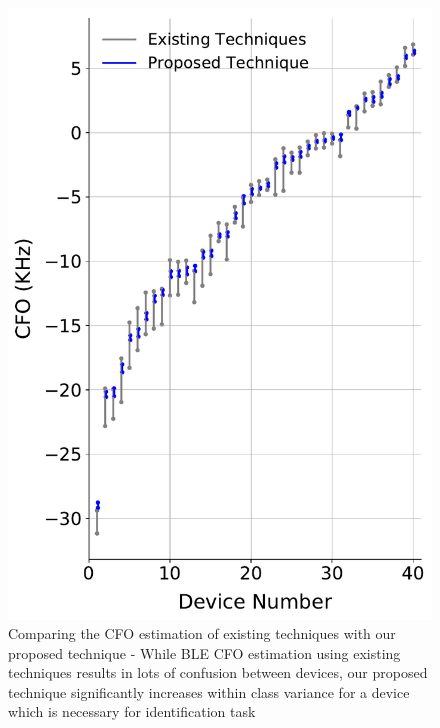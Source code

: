 \begin{figure}[t!]
    \centering
    \includegraphics[width = \linewidth]{plots/CFO_comparison.pdf} 
    \caption{Comparing the CFO estimation of existing techniques with our proposed technique - While BLE CFO estimation using existing techniques results in lots of confusion between devices, our proposed technique significantly increases within class variance for a device which is necessary for identification task}
    \label{fig:cfo_comp}
\end{figure}

